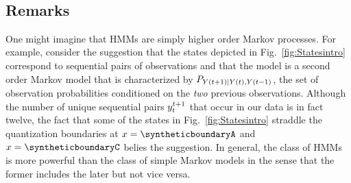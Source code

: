 \begin{table}[htb]
  \caption[Words most frequently associated with each state.]%
  {Words most frequently associated with each state.  While we have no
    interpretation for some of the states, the following
    interpretations of other states are plausible.}
  \begin{center}{\plotsize%
      \\[2.0ex]
      
    }\end{center}
  \label{tab:POS}
\end{table}

\subsection{Remarks}
\label{sec:DHMMRemarks}

One might imagine that HMMs are simply higher order Markov processes.
For example, consider the suggestion that the states depicted in
Fig.~\ref{fig:Statesintro} correspond to sequential pairs of
observations and that the model is a second order Markov model that is
characterized by $P_{{Y}{(t+1)}|{Y}{(t)},{Y}{(t-1)}}$, the set of
observation probabilities conditioned on the \emph{two} previous
observations.  Although the number of unique sequential pairs
$y_{t}^{t+1}$ that occur in our data is in fact twelve, the fact
that some of the states in Fig.~\ref{fig:Statesintro} straddle the
quantization boundaries at $x = \syntheticboundaryA$ and
$x=\syntheticboundaryC$ belies the suggestion.  In general, the class
of HMMs is more powerful than the class of simple Markov models in the
sense that the former includes the later but not vice versa.

